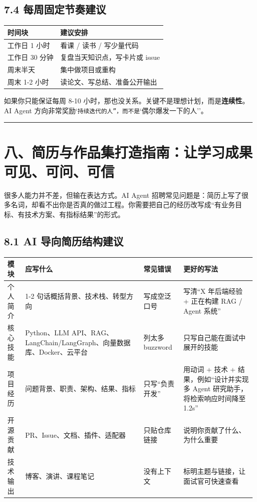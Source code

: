 \subsection{7.4 每周固定节奏建议}

\begingroup
\scriptsize
\setlength{\tabcolsep}{3pt}
\begin{longtable}{|p{}|p{}|}
\hline
时间块 & 建议安排 \\ \hline
工作日 1 小时 & 看课 / 读书 / 写少量代码 \\ \hline
工作日 30 分钟 & 复盘当天知识点，写卡片或 issue \\ \hline
周末半天 & 集中做项目或重构 \\ \hline
周末 1-2 小时 & 读论文、写总结、准备公开输出 \\ \hline
\end{longtable}
\endgroup

如果你只能保证每周 8-10 小时，那也没关系。关键不是理想计划，而是\textbf{连续性}。AI Agent 方向非常奖励`\texttt{持续迭代的人''，而不是}`偶尔爆发一下的人''。


\bigskip\hrule\bigskip

\section{八、简历与作品集打造指南：让学习成果可见、可问、可信}

很多人能力并不差，但输在表达方式。AI Agent 招聘常见问题是：简历上写了很多名词，却看不出你是否真的做过工程。你需要把自己的经历改写成``有业务目标、有技术方案、有指标结果''的形式。


\subsection{8.1 AI 导向简历结构建议}

\begingroup
\scriptsize
\setlength{\tabcolsep}{3pt}
\begin{longtable}{|p{}|p{}|p{}|p{}|}
\hline
模块 & 应写什么 & 常见错误 & 更好的写法 \\ \hline
个人简介 & 1-2 句话概括背景、技术栈、转型方向 & 写成空泛口号 & 写清``X 年后端经验 + 正在构建 RAG / Agent 系统'' \\ \hline
核心技能 & Python、LLM API、RAG、LangChain/LangGraph、向量数据库、Docker、云平台 & 列太多 buzzword & 只写自己能在面试中展开的技能 \\ \hline
项目经历 & 问题背景、职责、架构、结果、指标 & 只写``负责开发'' & 用动词 + 技术 + 结果，例如``设计并实现多 Agent 研究助手，将检索响应时间降至 1.2s'' \\ \hline
开源贡献 & PR、Issue、文档、插件、适配器 & 只贴仓库链接 & 说明你贡献了什么、为什么重要 \\ \hline
技术输出 & 博客、演讲、课程笔记 & 没有上下文 & 标明主题与链接，让面试官可快速查看 \\ \hline
\end{longtable}
\endgroup

